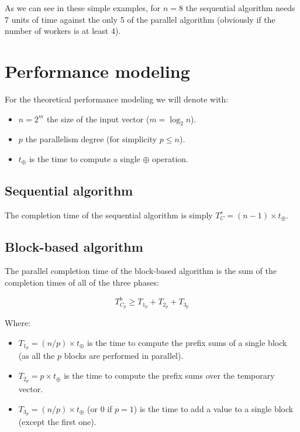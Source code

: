 \documentclass{article}
\begin{document}
As we can see in these simple examples, for $n = 8$ the sequential algorithm needs $7$ units of time against the only $5$ of the parallel algorithm (obviously if the number of workers is at least $4$). 

\section{Performance modeling}

For the theoretical performance modeling we will denote with:

\begin{itemize}
  \item $n = 2^m$ the size of the input vector ($m = \log_2{n}$).
  \item $p$ the parallelism degree (for simplicity $p \leq n$).
  \item $t_{\oplus}$ is the time to compute a single $\oplus$ operation.
\end{itemize} 

\subsection{Sequential algorithm}

The completion time of the sequential algorithm is simply $T^{s}_C = (n-1) \times t_{\oplus}$. 

\subsection{Block-based algorithm}

The parallel completion time of the block-based algorithm is the sum of the completion times of all of the three phases:

\begin{equation*}
  T^{b}_{C_p} \geq T_{1_p} + T_{2_p} + T_{3_p}
\end{equation*} 

Where:

\begin{itemize}
  \item $T_{1_p} = (n/p) \times t_{\oplus}$ is the time to compute the prefix sums of a single block (as all the $p$ blocks are performed in parallel).
  \item $T_{2_p} = p \times t_{\oplus}$ is the time to compute the prefix sums over the temporary vector.
  \item $T_{3_p} = (n/p) \times t_{\oplus}$ (or $0$ if $p = 1$) is the time to add a value to a single block (except the first one).
\end{itemize}
\end{document}

